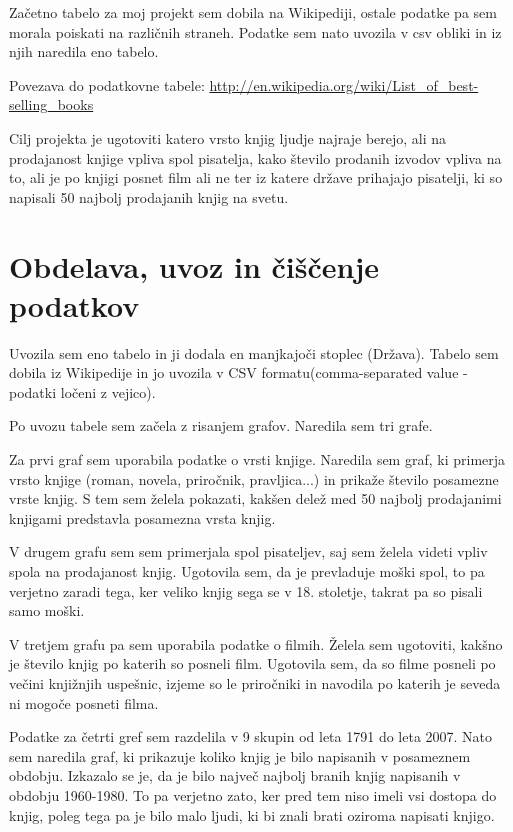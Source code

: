 \documentclass[11pt,a4paper]{article}
\begin{document}
Začetno tabelo za moj projekt sem dobila na Wikipediji, ostale podatke pa sem morala poiskati na različnih straneh. Podatke sem nato uvozila v csv obliki in iz njih naredila eno tabelo. 

Povezava do podatkovne tabele:
\url{http://en.wikipedia.org/wiki/List_of_best-selling_books}

Cilj projekta je ugotoviti katero vrsto knjig ljudje najraje berejo, ali na prodajanost knjige vpliva spol pisatelja, kako število prodanih izvodov vpliva na to, ali je po knjigi posnet film ali ne ter iz katere države prihajajo pisatelji, ki so napisali 50 najbolj prodajanih knjig na svetu. 

\pagebreak

\section{Obdelava, uvoz in čiščenje podatkov}

Uvozila sem eno tabelo in ji dodala en manjkajoči stoplec (Država). Tabelo sem dobila iz Wikipedije in jo uvozila v CSV formatu(comma-separated value - podatki ločeni z vejico).

Po uvozu tabele sem začela z risanjem grafov. Naredila sem tri grafe. 

Za prvi graf sem uporabila podatke o vrsti knjige. Naredila sem graf, ki primerja vrsto knjige (roman, novela, priročnik, pravljica...) in prikaže število posamezne vrste knjig. S tem sem želela pokazati, kakšen delež med 50 najbolj prodajanimi knjigami predstavla posamezna vrsta knjig.

V drugem grafu sem sem primerjala spol pisateljev, saj sem želela videti vpliv spola na prodajanost knjig. Ugotovila sem, da je prevladuje moški spol, to pa verjetno zaradi tega, ker veliko knjig sega se v 18. stoletje, takrat pa so pisali samo moški. 

V tretjem grafu pa sem uporabila podatke o filmih. Želela sem ugotoviti, kakšno je število knjig po katerih so posneli film. Ugotovila sem, da so filme posneli po večini knjižnjih uspešnic, izjeme so le priročniki in navodila po katerih je seveda ni mogoče posneti filma. 

Podatke za četrti gref sem razdelila v 9 skupin od leta 1791 do leta 2007. Nato sem naredila graf, ki prikazuje koliko knjig je bilo napisanih v posameznem obdobju. Izkazalo se je, da je bilo največ najbolj branih knjig napisanih v obdobju 1960-1980. To pa verjetno zato, ker pred tem niso imeli vsi dostopa do knjig, poleg tega pa je bilo malo ljudi, ki bi znali brati oziroma napisati knjigo. 
\end{document}
